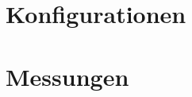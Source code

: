 \appendix

\section{Konfigurationen}
\label{appendix:configurations}

\section{Messungen}
\label{appendix:measures}




%  
% 

